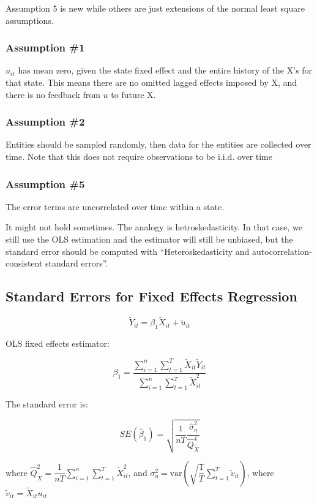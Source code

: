 \documentclass{article}
\newcommand{\sumlimits}{\sum \limits _{i=1}^{n}}
\newcommand{\sumlimitsT}{\sum \limits _{t=1}^{T}}
\begin{document}
Assumption 5 is new while others are just extensions of the normal least square assumptions.

\subsubsection{Assumption \#1}

$u_{it}$ has mean zero, given the state fixed effect and the entire history of the X's for that state.
This means there are no omitted lagged effects imposed by X,
and there is no feedback from $u$ to future X.

\subsubsection{Assumption \#2}

Entities should be sampled randomly, then data for the entities are collected over time.
Note that this does not require observations to be i.i.d. over time

\subsubsection{Assumption \#5}

The error terms are uncorrelated over time within a state.

It might not hold sometimes. The analogy is hetroskedasticity.
In that case, we still use the OLS estimation and the estimator will still be unbiased,
but the standard error should be computed with
``Heteroskedasticity and autocorrelation-consistent standard errors''.

\subsection{Standard Errors for Fixed Effects Regression}

\[
	\tilde{Y}_{it} = \beta_1 \tilde{X}_{it} + \tilde{u}_{it}
\]

OLS fixed effects estimator:

\[
	\beta_1 = \dfrac{
		\sumlimits \sumlimitsT \tilde{X}_{it} \tilde{Y}_{it}
	}{
		\sumlimits \sumlimitsT \tilde{X}_{it}^2
	}
\]

The standard error is:

\[
	SE(\hat{\beta}_1) = \sqrt{
		\dfrac{1}{nT}
		\dfrac{
			\hat{\sigma}^2_{\eta}
		}{
			\hat{Q}^4_{\tilde{X}}
		}
	}
\]

where $\hat{Q}^2_{\tilde{X}} = \dfrac{1}{nT} \sumlimits \sumlimitsT \tilde{X}_{it}^2$,
and $\sigma^2_\eta = \text{var} \left(
	\sqrt{\dfrac{1}{T}}
	\sumlimitsT \tilde{v}_{it}
\right)$, where $\tilde{v}_{it} = \tilde{X}_{it} u_{it}$
\end{document}
